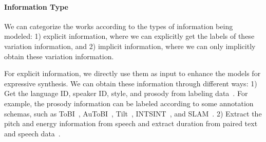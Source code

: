 \documentclass{article}
\begin{document}
\paragraph{Information Type} We can categorize the works according to the types of information being modeled: 1) explicit information, where we can explicitly get the labels of these variation information, and 2) implicit information, where we can only implicitly obtain these variation information. 

For explicit information, we directly use them as input to enhance the models for expressive synthesis. We can obtain these information through different ways: 1) Get the language ID, speaker ID, style, and prosody from labeling data~\cite{zhang2019learning,nekvinda2020one,li2021controllable,chen2020multispeech}. For example, the prosody information can be labeled according to some annotation schemas, such as  ToBI~\cite{silverman1992tobi}, AuToBI~\cite{rosenberg2010autobi}, Tilt~\cite{taylor1998tilt}, INTSINT~\cite{hirst2001automatic}, and SLAM~\cite{obin2014slam}. 2) Extract the pitch and energy information from speech and extract duration from paired text and speech data~\cite{ren2019fastspeech,ren2021fastspeech,lancucki2020fastpitch,kenter2019chive,morrison2020controllable,valle2020mellotron}.
\end{document}
